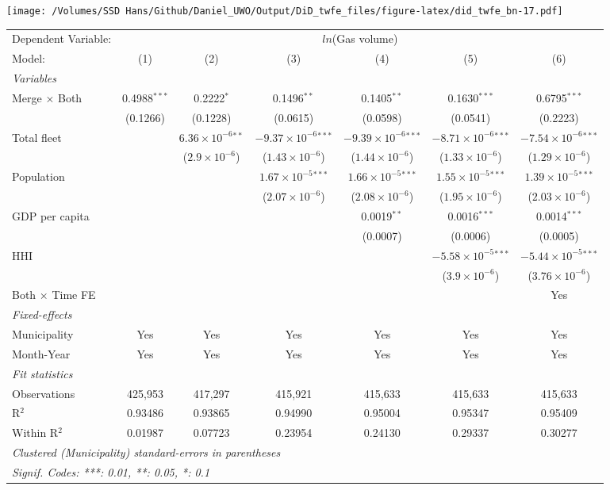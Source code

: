 \documentclass[
]{article}
\begin{document}
\texttt{[image: /Volumes/SSD Hans/Github/Daniel\_UWO/Output/DiD\_twfe\_files/figure-latex/did\_twfe\_bn-17.pdf]}

\begin{tabular}{lcccccc}
\tabularnewline\midrule\midrule
Dependent Variable:&\multicolumn{6}{c}{$ln$(Gas volume)}\\
Model:&(1) & (2) & (3) & (4) & (5) & (6)\\
\midrule \emph{Variables}&   &   &   &   &   &  \\
Merge $\times $ Both & 0.4988$^{***}$ & 0.2222$^{*}$ & 0.1496$^{**}$ & 0.1405$^{**}$ & 0.1630$^{***}$ & 0.6795$^{***}$\\
  &(0.1266) & (0.1228) & (0.0615) & (0.0598) & (0.0541) & (0.2223)\\
Total fleet &    & $6.36\times 10^{-6}$$^{**}$ & $-9.37\times 10^{-6}$$^{***}$ & $-9.39\times 10^{-6}$$^{***}$ & $-8.71\times 10^{-6}$$^{***}$ & $-7.54\times 10^{-6}$$^{***}$\\
  &   & ($2.9\times 10^{-6}$) & ($1.43\times 10^{-6}$) & ($1.44\times 10^{-6}$) & ($1.33\times 10^{-6}$) & ($1.29\times 10^{-6}$)\\
Population &    &    & $1.67\times 10^{-5}$$^{***}$ & $1.66\times 10^{-5}$$^{***}$ & $1.55\times 10^{-5}$$^{***}$ & $1.39\times 10^{-5}$$^{***}$\\
  &   &    & ($2.07\times 10^{-6}$) & ($2.08\times 10^{-6}$) & ($1.95\times 10^{-6}$) & ($2.03\times 10^{-6}$)\\
GDP per capita &    &    &    & 0.0019$^{**}$ & 0.0016$^{***}$ & 0.0014$^{***}$\\
  &   &    &    & (0.0007) & (0.0006) & (0.0005)\\
HHI &    &    &    &    & $-5.58\times 10^{-5}$$^{***}$ & $-5.44\times 10^{-5}$$^{***}$\\
  &   &    &    &    & ($3.9\times 10^{-6}$) & ($3.76\times 10^{-6}$)\\
Both $\times$ Time FE &  &  &  &  &  & Yes\\
\midrule \emph{Fixed-effects}&   &   &   &   &   &  \\
Municipality & Yes & Yes & Yes & Yes & Yes & Yes\\
Month-Year & Yes & Yes & Yes & Yes & Yes & Yes\\
\midrule \emph{Fit statistics}&  & & & & & \\
Observations & 425,953&417,297&415,921&415,633&415,633&415,633\\
R$^2$ & 0.93486&0.93865&0.94990&0.95004&0.95347&0.95409\\
Within R$^2$ & 0.01987&0.07723&0.23954&0.24130&0.29337&0.30277\\
\midrule\midrule\multicolumn{7}{l}{\emph{Clustered (Municipality) standard-errors in parentheses}}\\
\multicolumn{7}{l}{\emph{Signif. Codes: ***: 0.01, **: 0.05, *: 0.1}}\\
\end{tabular}
\end{document}
